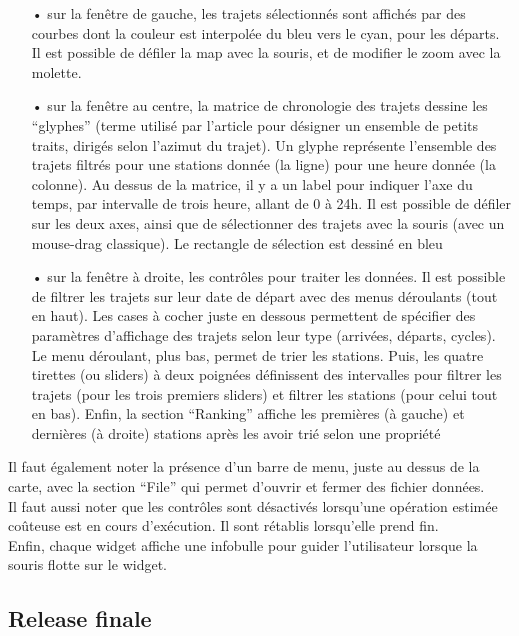 \documentclass[12pt]{article}
\begin{document}
		\begin{itemize}
		\item[•] sur la fenêtre de gauche, les trajets sélectionnés sont affichés par des courbes dont la couleur est interpolée du bleu vers le cyan, pour les départs. Il est possible de défiler la map avec la souris, et de modifier le zoom avec la molette.
		\item[•] sur la fenêtre au centre, la matrice de chronologie des trajets dessine les “glyphes” (terme utilisé par l’article pour désigner un ensemble de petits traits, dirigés selon l’azimut du trajet). Un glyphe représente l’ensemble des trajets filtrés pour une stations donnée (la ligne) pour une heure donnée (la colonne). Au dessus de la matrice, il y a un label pour indiquer l’axe du temps, par intervalle de trois heure, allant de 0 à 24h. Il est possible de défiler sur les deux axes, ainsi que de sélectionner des trajets avec la souris (avec un mouse-drag classique). Le rectangle de sélection est dessiné en bleu
		\item[•] sur la fenêtre à droite, les contrôles pour traiter les données. Il est possible de filtrer les trajets sur leur date de départ avec des menus déroulants (tout en haut). Les cases à cocher juste en dessous permettent de spécifier des paramètres d’affichage des trajets selon leur type (arrivées, départs, cycles). Le menu déroulant, plus bas, permet de trier les stations. Puis, les quatre tirettes (ou sliders) à deux poignées définissent des intervalles pour filtrer les trajets (pour les trois premiers sliders) et filtrer les stations (pour celui tout en bas). Enfin, la section “Ranking” affiche les premières (à gauche) et dernières (à droite) stations après les avoir trié selon une propriété
		\end{itemize}
		
		Il faut également noter la présence d’un barre de menu, juste au dessus de la carte, avec la section “File” qui permet d’ouvrir et fermer des fichier données.\\

		Il faut aussi noter que les contrôles sont désactivés lorsqu’une opération estimée coûteuse est en cours d'exécution. Il sont rétablis lorsqu’elle prend fin.\\

		Enfin, chaque widget affiche une infobulle pour guider l’utilisateur lorsque la souris flotte sur le widget.

		\subsection{Release finale}
		
\end{document}
